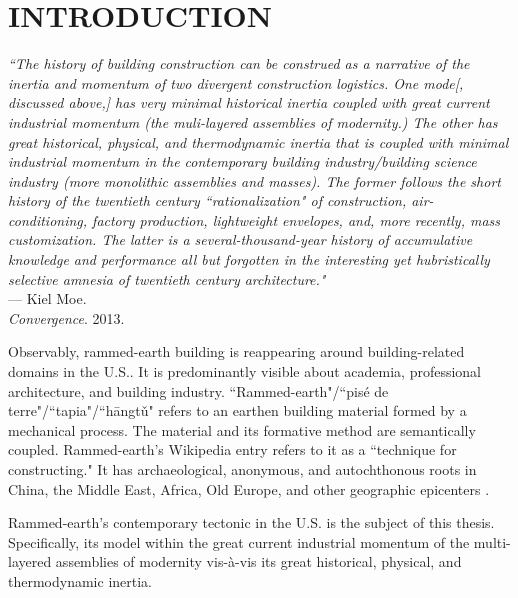\section{INTRODUCTION}

\begin{flushright}
  \small{
  \textit{``The history of building construction can be construed as a narrative of the inertia and momentum of two divergent construction logistics. One mode[, discussed above,] has very minimal historical inertia coupled with great current industrial momentum (the muli-layered assemblies of modernity.) The other has great historical, physical, and thermodynamic inertia that is coupled with minimal industrial momentum in the contemporary building industry/building science industry (more monolithic assemblies and masses). The former follows the short history of the twentieth century ``rationalization" of construction, air-conditioning, factory production, lightweight envelopes, and, more recently, mass customization. The latter is a several-thousand-year history of accumulative knowledge and performance all but forgotten in the interesting yet hubristically selective amnesia of twentieth century architecture."}}\\ --- Kiel Moe. \\ \textit{Convergence}. 2013.
\end{flushright}

Observably, rammed-earth building is reappearing around building-related domains in the U.S.. It is predominantly visible about academia, professional architecture, and building industry. ``Rammed-earth"/``pis\'e de terre"/``tapia"/``h\=angt\v u" refers to an earthen building material formed by a mechanical process. The material and its formative method are semantically coupled. Rammed-earth's Wikipedia entry refers to it as a ``technique for constructing." It has archaeological, anonymous, and autochthonous roots in China, the Middle East, Africa, Old Europe, and other geographic epicenters \cite{RAMMEDEARTHHOUSE}.

\vspace{5mm}

\noindent Rammed-earth's contemporary tectonic in the U.S. is the subject of this thesis. Specifically, its model within the great current industrial momentum of the multi-layered assemblies of modernity vis-\`a-vis its great historical, physical, and thermodynamic inertia. \\


